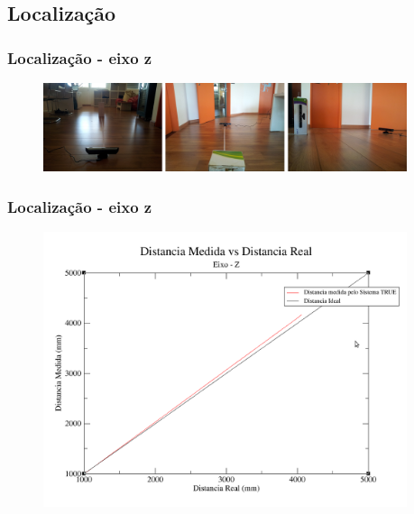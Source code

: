 \documentclass{beamer}
\begin{document}
   
    \subsection{Localização}
    
    	\begin{frame}
	    	\frametitle{Localização - eixo z}
	    	
	    	\begin{figure}[htb]
				\begin{center}
					\includegraphics[width=0.95\textwidth]{figuras/5.Testes/teste-eixoz.png}
				\end{center}
			\end{figure}
	    \end{frame}
	    
    	\begin{frame}
	    	\frametitle{Localização - eixo z}
	    	
	    	\begin{figure}[htb]
				\begin{center}
					\includegraphics[width=0.95\textwidth]{figuras/5.Testes/grafico-eixo-z.png}
				\end{center}
			\end{figure}
	    \end{frame}
	        
\end{document}
